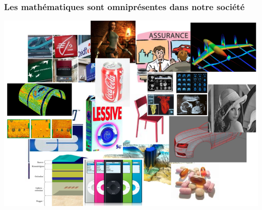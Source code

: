 \documentclass[slideopt,A4]{beamer}
\begin{document}



\begin{frame}
\frametitle{Les mathématiques sont omniprésentes dans notre société}
%
\begin{center}
\includegraphics[width=0.90\linewidth]{mix.png}
\end{center}

\end{frame}
%
%
\end{document}
